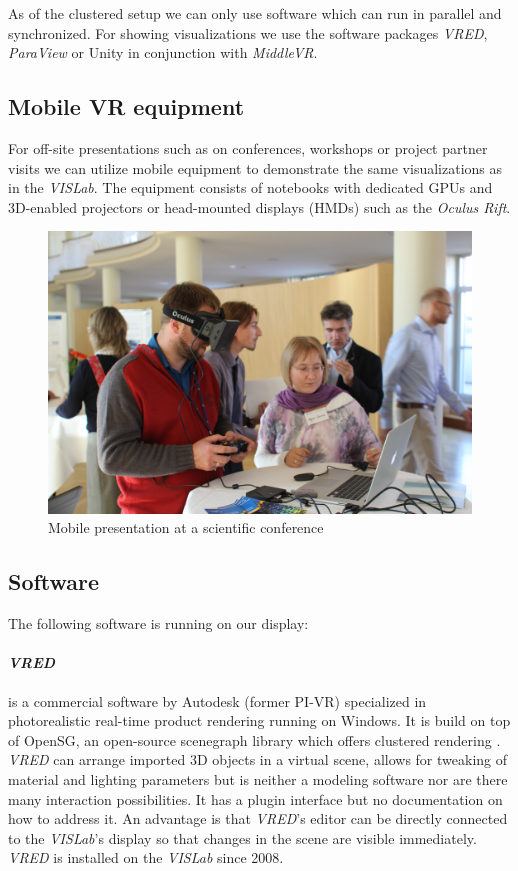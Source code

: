 As of the clustered setup we can only use software which can run in parallel and synchronized. For showing visualizations we use the software packages \emph{VRED}, \emph{ParaView} or Unity in conjunction with \emph{MiddleVR}.

\subsection{Mobile VR equipment}
\label{mobile-vr-equipment}

For off-site presentations such as on conferences, workshops or project partner visits we can utilize mobile equipment to demonstrate the same visualizations as in the \emph{VISLab}. The equipment consists of notebooks with dedicated GPUs and 3D-enabled projectors or head-mounted displays (HMDs) such as the \emph{Oculus Rift}.

\begin{figure}
  \includegraphics[width=\linewidth]{images/rift.jpg}
\caption{Mobile presentation at a scientific conference}
\label{fig:rift}
\end{figure}

\subsection{Software}
\label{software}

The following software is running on our display:

\paragraph{\emph{VRED}}
is a commercial software by Autodesk (former PI-VR) specialized in photorealistic real-time product rendering running on Windows. It is build on top of OpenSG, an open-source scenegraph library which offers clustered rendering \cite{opensg}. \emph{VRED} can arrange imported 3D objects in a virtual scene, allows for tweaking of material and lighting parameters but is neither a modeling software nor are there many interaction possibilities. It has a plugin interface but no documentation on how to address it. An advantage is that \emph{VRED}'s editor can be directly connected to the \emph{VISLab}'s display so that changes in the scene are visible immediately. \emph{VRED} is installed on the \emph{VISLab} since
2008.

